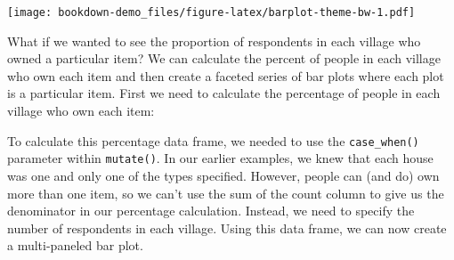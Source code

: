 \documentclass[]{book}
\newenvironment{Shaded}{\begin{snugshade}}{\end{snugshade}}
\newcommand{\KeywordTok}[1]{\textcolor[rgb]{0.13,0.29,0.53}{\textbf{#1}}}
\newcommand{\DataTypeTok}[1]{\textcolor[rgb]{0.13,0.29,0.53}{#1}}
\newcommand{\DecValTok}[1]{\textcolor[rgb]{0.00,0.00,0.81}{#1}}
\newcommand{\StringTok}[1]{\textcolor[rgb]{0.31,0.60,0.02}{#1}}
\newcommand{\OperatorTok}[1]{\textcolor[rgb]{0.81,0.36,0.00}{\textbf{#1}}}
\newcommand{\NormalTok}[1]{#1}
\begin{document}
\texttt{[image: bookdown-demo\_files/figure-latex/barplot-theme-bw-1.pdf]}

What if we wanted to see the proportion of respondents in each village
who owned a particular item? We can calculate the percent of people in
each village who own each item and then create a faceted series of bar
plots where each plot is a particular item. First we need to calculate
the percentage of people in each village who own each item:

\begin{Shaded}
\end{Shaded}

To calculate this percentage data frame, we needed to use the
\texttt{case\_when()} parameter within \texttt{mutate()}. In our earlier
examples, we knew that each house was one and only one of the types
specified. However, people can (and do) own more than one item, so we
can't use the sum of the count column to give us the denominator in our
percentage calculation. Instead, we need to specify the number of
respondents in each village. Using this data frame, we can now create a
multi-paneled bar plot.
\end{document}
